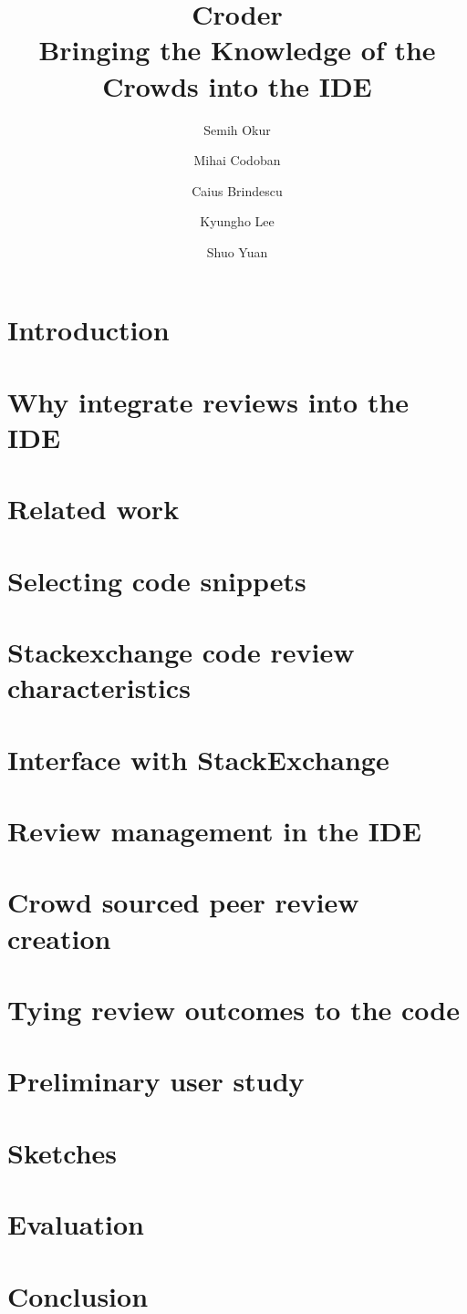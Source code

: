 \documentclass[10pt,letterpaper]{article}
\title{Croder \\ Bringing the Knowledge of the Crowds into the IDE}
\author{Semih Okur \and Mihai Codoban \and Caius Brindescu \and Kyungho Lee \and Shuo Yuan}
\begin{document}
\maketitle

\section{Introduction}
\section{Why integrate reviews into the IDE}
\section{Related work}
\section{Selecting code snippets}
\section{Stackexchange code review characteristics}
\section{Interface with StackExchange}
\section{Review management in the IDE}
\section{Crowd sourced peer review creation}
\section{Tying review outcomes to the code}
\section{Preliminary user study}
\section{Sketches}
\section{Evaluation}
\section{Conclusion}
\end{document}
